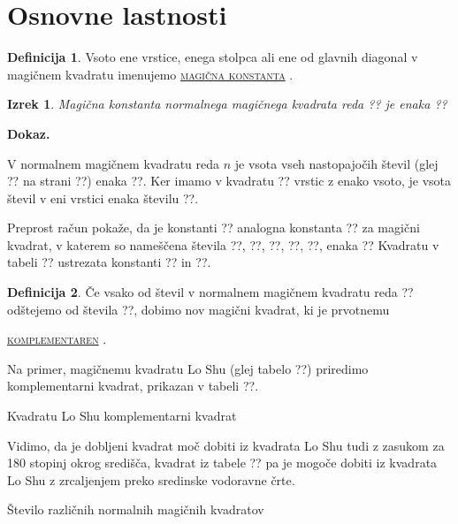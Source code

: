 \documentclass[a4paper,12pt]{article}
\theoremstyle{definition}
\newtheorem{defn}{Definicija}
\theoremstyle{plain}
\newtheorem{thrm}{Izrek}
\newenvironment{dokaz}{%
   \proof[\ttfamily \scshape \large]
   \noindent\textbf{Dokaz.}
   }{
      \endproof
      }
\newcommand{\pojem}[1]{
   \underline{\textsc{#1}}
}
\begin{document}

\section{Osnovne lastnosti}

\begin{defn}

   Vsoto ene vrstice, enega stolpca ali ene od glavnih diagonal
   v magičnem kvadratu imenujemo \pojem{magična konstanta}.

\end{defn}

\begin{thrm}

   Magična konstanta normalnega magičnega kvadrata reda ??
   je enaka
   ??

\end{thrm}

\begin{dokaz}
   V normalnem magičnem kvadratu reda $n$ je vsota vseh nastopajočih
   števil (glej ?? na strani ??) enaka
   ??. Ker imamo
   v kvadratu ?? vrstic z enako vsoto, je vsota števil v eni vrstici
   enaka številu ??.
\end{dokaz}

Preprost račun pokaže, da je konstanti ?? analogna konstanta
?? za magični kvadrat, v katerem so nameščena števila
??, ??, ??, ??, ??, enaka
??
Kvadratu v tabeli ?? ustrezata konstanti ?? in ??.

\begin{defn}
   Če vsako od števil v normalnem magičnem kvadratu reda ?? odštejemo
   od števila ??, dobimo nov magični kvadrat, ki je prvotnemu
   \pojem{komplementaren}.
\end{defn}

Na primer, magičnemu kvadratu Lo Shu (glej tabelo ??) priredimo
komplementarni kvadrat, prikazan v tabeli ??.

Kvadratu Lo Shu komplementarni kvadrat

Vidimo, da je dobljeni kvadrat moč dobiti iz kvadrata Lo Shu tudi z zasukom za
180 stopinj okrog središča, kvadrat iz tabele ?? pa je mogoče dobiti
iz kvadrata Lo Shu z zrcaljenjem preko sredinske vodoravne črte.

Število različnih normalnih magičnih kvadratov
\end{document}
